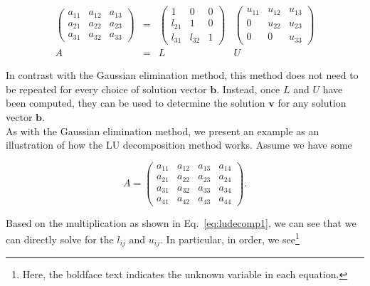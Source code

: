 \documentclass[12pt]{article}
\numberwithin{equation}{section}
\begin{document}
\begin{equation}
\label{eq:ludecomp1}
\begin{array}{cccc}
\left(
\begin{array}{ccc}
a_{11} & a_{12} & a_{13} \\
a_{21} & a_{22} & a_{23} \\
a_{31} & a_{32} & a_{33}
\end{array}
\right) &=&
\left(
\begin{array}{ccc}
1 & 0 & 0 \\
l_{21} & 1 & 0 \\
l_{31} & l_{32} & 1
\end{array}\right)&
\left(\begin{array}{ccc}
u_{11} & u_{12} & u_{13} \\
0 & u_{22} & u_{23} \\
0 & 0 & u_{33}
\end{array}\right) \\
A &=& L&U
\end{array}
\end{equation}

\noindent In contrast with the Gaussian elimination method, this method does not need to be repeated for every choice of solution vector $\textbf{b}$.  Instead, once $L$ and $U$ have been computed, they can be used to determine the solution $\textbf{v}$ for any solution vector $\textbf{b}$.
\\\indent As with the Gaussian elimination method, we present an example as an illustration of how the LU decomposition method works.  Assume we have some 

\begin{equation}
\label{eq:ainit2}
A = \left(\begin{array}{cccc}
a_{11} & a_{12} & a_{13} & a_{14} \\
a_{21} & a_{22} & a_{23} & a_{24} \\
a_{31} & a_{32} & a_{33} & a_{34} \\
a_{41} & a_{42} & a_{43} & a_{44}
\end{array}\right).
\end{equation}
\vspace{.2cm}

\noindent Based on the multiplication as shown in Eq.~\ref{eq:ludecomp1}, we can see that we can directly solve for the $l_{ij}$ and $u_{ij}$.  In particular, in order, we see\footnote{Here, the boldface text indicates the unknown variable in each equation.}
\end{document}
